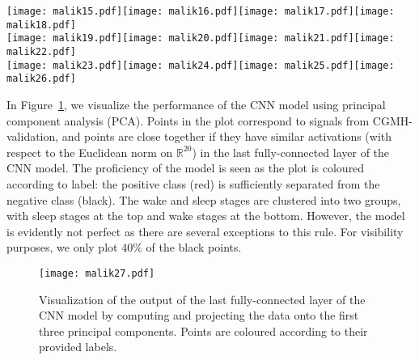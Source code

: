 \documentclass[10pt,a4paper,english]{amsart}
\begin{document}
\begin{figure*}
\centering
\vspace{0.2in}
\texttt{[image: malik15.pdf]}\texttt{[image: malik16.pdf]}\texttt{[image: malik17.pdf]}\texttt{[image: malik18.pdf]}\\
\texttt{[image: malik19.pdf]}\texttt{[image: malik20.pdf]}\texttt{[image: malik21.pdf]}\texttt{[image: malik22.pdf]}\\
\texttt{[image: malik23.pdf]}\texttt{[image: malik24.pdf]}\texttt{[image: malik25.pdf]}\texttt{[image: malik26.pdf]}\\
\caption{\label{Fig:Activations} We present typical activations in the last convolutional layer of the CNN model. The top row shows four typical input IHR signals, and the corresponding activations in the last convolutional layer of the CNN model are shown in the bottom two rows. See \eqref{Eq:Wake} and \eqref{Eq:Sleep} for definitions of $\sigma_i^\mathrm{wake}$ and $\sigma_i^\mathrm{sleep}$. The red colour indicates that the subject is awake, whereas the black colour indicates that the subject is asleep.}
\end{figure*}


In Figure~\ref{Fig:PCA}, we visualize the performance of the CNN model using principal component analysis (PCA). Points in the plot correspond to signals from CGMH-validation, and points are close together if they have similar activations (with respect to the Euclidean norm on $\mathbb{R}^{20}$) in the last fully-connected layer of the CNN model. The proficiency of the model is seen as the plot is coloured according to label:  the positive class (red) is sufficiently separated from the negative class (black). The wake and sleep stages are clustered into two groups, with sleep stages at the top and wake stages at the bottom.  However, the model is evidently not perfect as there are several exceptions to this rule.  For visibility purposes, we only plot $40 \%$ of the black points. 


\begin{figure}
\centering
\texttt{[image: malik27.pdf]}
\caption{\label{Fig:PCA}Visualization of the output of the last fully-connected layer of the CNN model by computing and projecting the data onto the first three principal components. Points are coloured according to their provided labels.}
\end{figure}
\end{document}
